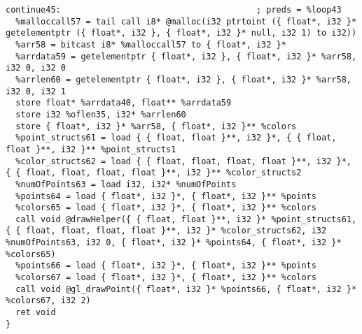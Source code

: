 \documentclass[main.tex]{subfiles}
\begin{document}
{\begin{lstlisting}
continue45:                                       ; preds = %loop43
  %malloccall57 = tail call i8* @malloc(i32 ptrtoint ({ float*, i32 }* getelementptr ({ float*, i32 }, { float*, i32 }* null, i32 1) to i32))
  %arr58 = bitcast i8* %malloccall57 to { float*, i32 }*
  %arrdata59 = getelementptr { float*, i32 }, { float*, i32 }* %arr58, i32 0, i32 0
  %arrlen60 = getelementptr { float*, i32 }, { float*, i32 }* %arr58, i32 0, i32 1
  store float* %arrdata40, float** %arrdata59
  store i32 %oflen35, i32* %arrlen60
  store { float*, i32 }* %arr58, { float*, i32 }** %colors
  %point_structs61 = load { { float, float }**, i32 }*, { { float, float }**, i32 }** %point_structs1
  %color_structs62 = load { { float, float, float, float }**, i32 }*, { { float, float, float, float }**, i32 }** %color_structs2
  %numOfPoints63 = load i32, i32* %numOfPoints
  %points64 = load { float*, i32 }*, { float*, i32 }** %points
  %colors65 = load { float*, i32 }*, { float*, i32 }** %colors
  call void @drawHelper({ { float, float }**, i32 }* %point_structs61, { { float, float, float, float }**, i32 }* %color_structs62, i32 %numOfPoints63, i32 0, { float*, i32 }* %points64, { float*, i32 }* %colors65)
  %points66 = load { float*, i32 }*, { float*, i32 }** %points
  %colors67 = load { float*, i32 }*, { float*, i32 }** %colors
  call void @gl_drawPoint({ float*, i32 }* %points66, { float*, i32 }* %colors67, i32 2)
  ret void
}


\end{lstlisting}}
\end{document}
